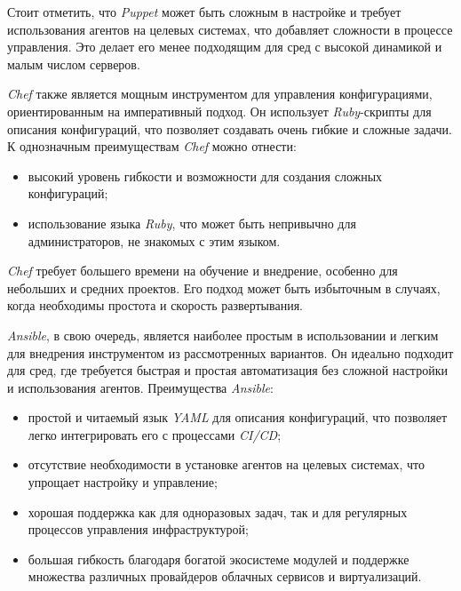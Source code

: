 Стоит отметить, что \textit{Puppet} может быть сложным в настройке и требует использования агентов на целевых системах, что добавляет сложности в процессе управления. Это делает его менее подходящим для сред с высокой динамикой и малым числом серверов.


\textit{Chef} также является мощным инструментом для управления конфигурациями, ориентированным на императивный подход. Он использует \textit{Ruby}-скрипты для описания конфигураций, что позволяет создавать очень гибкие и сложные задачи. К однозначным преимуществам \textit{Chef} можно отнести:
\begin{itemize}
    \item высокий уровень гибкости и возможности для создания сложных конфигураций;
    \item использование языка \textit{Ruby}, что может быть непривычно для администраторов, не знакомых с этим языком.
\end{itemize}

\textit{Chef} требует большего времени на обучение и внедрение, особенно для небольших и средних проектов. Его подход может быть избыточным в случаях, когда необходимы простота и скорость развертывания.


\textit{Ansible}, в свою очередь, является наиболее простым в использовании и легким для внедрения инструментом из рассмотренных вариантов. Он идеально подходит для сред, где требуется быстрая и простая автоматизация без сложной настройки и использования агентов. Преимущества \textit{Ansible}:
\begin{itemize}
    \item простой и читаемый язык \textit{YAML} для описания конфигураций, что позволяет легко интегрировать его с процессами \textit{CI/CD};
    \item отсутствие необходимости в установке агентов на целевых системах, что упрощает настройку и управление;
    \item хорошая поддержка как для одноразовых задач, так и для регулярных процессов управления инфраструктурой;
    \item большая гибкость благодаря богатой экосистеме модулей и поддержке множества различных провайдеров облачных сервисов и виртуализаций.
\end{itemize}

